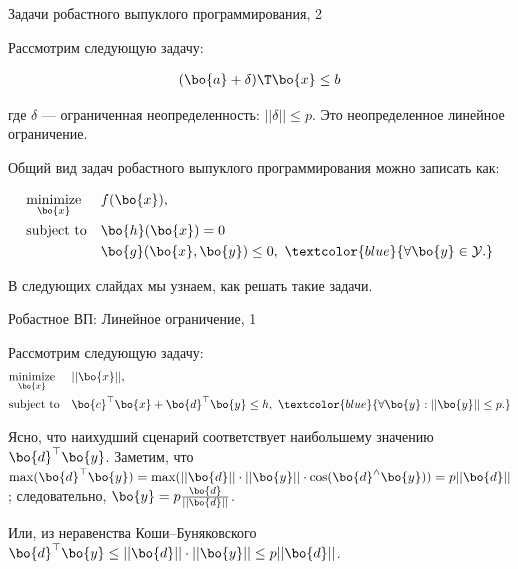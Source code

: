 \documentclass{beamer}
\begin{document}
\begin{frame}{Задачи робастного выпуклого программирования, 2}
	\begin{flushleft}
		
		Рассмотрим следующую задачу: 
		
		\begin{align}
			(\bo{a} + \delta)\T \bo{x} \leq b
		\end{align}
		
		где $\delta$ — ограниченная неопределенность: $||\delta|| \leq p$. Это неопределенное линейное ограничение.
		
		\bigskip
		
		Общий вид задач робастного выпуклого программирования можно записать как:
		
		\begin{equation}
			\begin{aligned}
				& \underset{\bo{x}}{\text{minimize}} 
				& & f(\bo{x}), \\
				& \text{subject to}
				& & \bo{h}(\bo{x}) = 0 \\
				& & & \bo{g}(\bo{x}, \bo{y}) \leq 0, \ 
				\textcolor{blue}{
					\forall \bo{y}  \in \mathcal{Y}.} 
			\end{aligned}
		\end{equation}
		
		
		\bigskip
		
		В следующих слайдах мы узнаем, как решать такие задачи.
		
		
	\end{flushleft}
\end{frame}

\begin{frame}{Робастное ВП: Линейное ограничение, 1}
	\begin{flushleft}
		
		Рассмотрим следующую задачу:
		\begin{equation}
			\begin{aligned}
				& \underset{\bo{x}}{\text{minimize}} 
				& & ||\bo{x}||, \\
				& \text{subject to}
				& & \bo{c}^\top \bo{x} + \bo{d}^\top \bo{y} \leq h, \ 
				\textcolor{blue}{
					\forall \bo{y} :  ||\bo{y}|| \leq p.} 
			\end{aligned}
		\end{equation}
		
		Ясно, что наихудший сценарий соответствует наибольшему значению $\bo{d}^\top \bo{y}$. Заметим, что $\text{max}(\bo{d}^\top \bo{y}) = \text{max}(||\bo{d}|| \cdot ||\bo{y}|| \cdot \text{cos}(\bo{d}^\wedge \bo{y})) =  p||\bo{d}||$; следовательно, $\bo{y} =  p \frac{\bo{d}}{|| \bo{d} ||} $.
		
		\bigskip
		
		\textcolor{mygray}{
			Или, из неравенства Коши–Буняковского $\bo{d}^\top \bo{y} \leq ||\bo{d}|| \cdot ||\bo{y}|| \leq p||\bo{d}||$.
		}
		
	\end{flushleft}
\end{frame}
\end{document}
